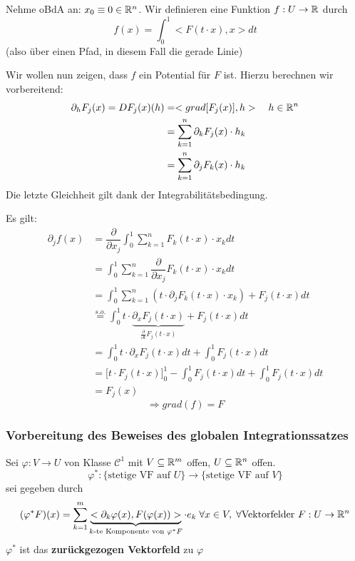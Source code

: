 \documentclass[main.tex]{subfiles}
\begin{document}
\begin{Beweis}
  Nehme oBdA an: $x_0 \equiv 0 \in \mathbb{R}^n$. Wir definieren eine Funktion $f: U \to \mathbb{R}$ durch
  $$f(x) = \int_0^1 <F(t\cdot x),x> dt$$
  (also über einen Pfad, in diesem Fall die gerade Linie)

  Wir wollen nun zeigen, dass $f$ ein Potential für $F$ ist. Hierzu berechnen wir vorbereitend:
  $$\begin{aligned}
    \partial_h F_j (x) = DF_j(x)(h) & = <grad[F_j(x)],h> \quad h \in \mathbb{R}^n \\
    & = \sum \limits_{k=1}^n \partial_k F_j(x)\cdot h_k \\
    & = \sum \limits_{k=1}^n \partial_j F_k(x)\cdot h_k
  \end{aligned}$$
  Die letzte Gleichheit gilt dank der Integrabilitätsbedingung.

  Es gilt:
  $$\begin{aligned}
    \partial_j f(x) & = \dfrac{\partial}{\partial x_j} \int_0^1 \sum \limits_{k=1}^n F_k (t\cdot x) \cdot x_k dt \\
    & =  \int_0^1 \sum \limits_{k=1}^n \dfrac{\partial}{\partial x_j}  F_k (t\cdot x) \cdot x_k dt \\
    & = \int_0^1 \sum \limits_{k=1}^n (t \cdot \partial_j F_k(t\cdot x) \cdot x_k) + F_j(t \cdot x) dt \\
    & \stackrel{s.o.}{=} \int_0^1 t \cdot \underbrace{\partial_x F_j(t \cdot x)}_{\frac{\partial}{\partial t} F_j (t \cdot x)} + F_j(t \cdot x) dt\\
    & = \int_0^1 t \cdot \partial_x F_j(t \cdot x) dt + \int_0^1 F_j(t \cdot x) dt \\
    & = \Big[t \cdot F_j(t \cdot x)\Big]_0^1 - \int_0^1 F_j(t \cdot x) dt + \int_0^1 F_j(t \cdot x) dt \\
    & = F_j(x)
  \end{aligned}$$
  $$\Rightarrow grad(f) = F$$
\end{Beweis}

\subsubsection{Vorbereitung des Beweises des globalen Integrationssatzes}

\begin{Definition}
  Sei $\varphi: V \to U$ von Klasse $\mathcal{C}^1$ mit $V \subseteq \mathbb{R}^m$ offen, $U \subseteq \mathbb{R}^n$ offen.
  $$\varphi^* :\{\text{stetige VF auf $U$}\} \to \{\text{stetige VF auf $V$}\}$$
  sei gegeben durch
  $$(\varphi^* F)(x) = \sum \limits_{k = 1}^m \underbrace{<\partial_k \varphi(x) , F(\varphi(x))>}_{k\text{-te Komponente von }\varphi^* F} \cdot e_k \;\forall x \in V, \;\forall \text{Vektorfelder } F: U \to \mathbb{R}^n$$
  $\varphi^*$ ist das \textbf{zurückgezogen Vektorfeld} zu $\varphi$
\end{Definition}
\end{document}
